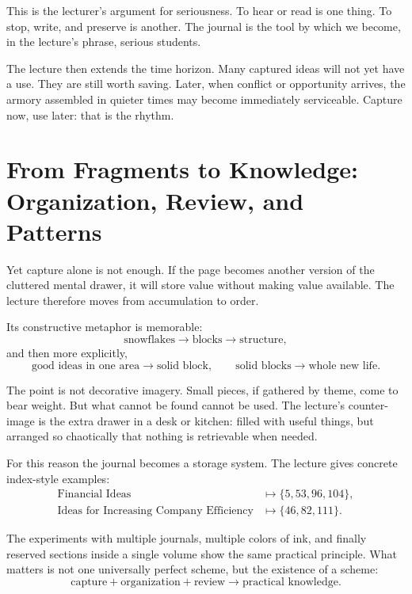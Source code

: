 This is the lecturer's argument for seriousness. To hear or read is one thing. To stop, write, and preserve is another. The journal is the tool by which we become, in the lecture's phrase, serious students.

The lecture then extends the time horizon. Many captured ideas will not yet have a use. They are still worth saving. Later, when conflict or opportunity arrives, the armory assembled in quieter times may become immediately serviceable. Capture now, use later: that is the rhythm.

\section{From Fragments to Knowledge: Organization, Review, and Patterns}

Yet capture alone is not enough. If the page becomes another version of the cluttered mental drawer, it will store value without making value available. The lecture therefore moves from accumulation to order.

Its constructive metaphor is memorable:
\begin{equation}
\text{snowflakes}\rightarrow \text{blocks}\rightarrow \text{structure},
\end{equation}
and then more explicitly,
\begin{equation}
\text{good ideas in one area}\rightarrow \text{solid block},\qquad
\text{solid blocks}\rightarrow \text{whole new life}.
\end{equation}

The point is not decorative imagery. Small pieces, if gathered by theme, come to bear weight. But what cannot be found cannot be used. The lecture's counter-image is the extra drawer in a desk or kitchen: filled with useful things, but arranged so chaotically that nothing is retrievable when needed.

For this reason the journal becomes a storage system. The lecture gives concrete index-style examples:
\begin{align}
\text{Financial Ideas}&\mapsto \{5,53,96,104\},\\
\text{Ideas for Increasing Company Efficiency}&\mapsto \{46,82,111\}.
\end{align}

The experiments with multiple journals, multiple colors of ink, and finally reserved sections inside a single volume show the same practical principle. What matters is not one universally perfect scheme, but the existence of a scheme:
\begin{equation}
\text{capture}+\text{organization}+\text{review}\rightarrow \text{practical knowledge}.
\end{equation}

